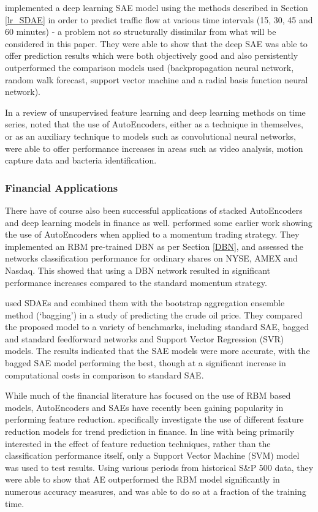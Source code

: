 \documentclass[a4paper,11pt,oneside]{article}
\theoremstyle{plain}
\theoremstyle{definition}
\begin{document}
	\citet{Lv} implemented a deep learning SAE model using the methods described in Section \ref{lr_SDAE} in order to 
	predict traffic flow at various time intervals (15, 30, 45 and 60 minutes) - a problem not so structurally dissimilar 
	from what will be considered in this paper. They were able to show that the deep SAE was able to offer prediction 
	results which were both objectively good and also persistently outperformed the comparison models used 
	(backpropagation neural network, random walk forecast, support vector machine and a radial basis function 
	neural network).
	\hfill \break 
	
	In a review of unsupervised feature learning and deep learning methods on time series, \citet{Langkvist} noted that 
	the use of AutoEncoders, either as a technique in themselves, or as an auxiliary technique to models 
	such as convolutional neural networks, were able to offer performance increases in areas such as video analysis, 
	motion capture data and bacteria identification.
	
	\subsubsection{Financial Applications}
	
	There have of course also been successful applications of stacked AutoEncoders and deep learning models in 
	finance as well. \citet{Takeuchi} performed some earlier work showing the use of AutoEncoders when applied to a 
	momentum trading strategy. They implemented an RBM pre-trained DBN as per Section \ref{DBN}, and assessed the 
	networks classification performance for ordinary shares on NYSE, AMEX and Nasdaq. This showed that using a 
	DBN network resulted in significant performance increases compared to the standard momentum strategy.
	\hfill \break 
	
	\citet{Zhao} used SDAEs and combined them with the bootstrap aggregation ensemble method (‘bagging’) in a 
	study of predicting the crude oil price. They compared the proposed model to a variety of benchmarks, including 
	standard SAE, bagged and standard feedforward networks and Support Vector Regression (SVR) models. The results indicated that the SAE models 
	were more accurate, with the bagged SAE model performing the best, though at a significant increase in 
	computational costs in comparison to standard SAE.
	\hfill \break 
	
	While much of the financial literature has focused on the use of RBM based models, AutoEncoders and SAEs have 
	recently been gaining popularity in performing feature reduction. \citet{Troiano} specifically investigate the use of 
	different feature reduction models for trend prediction in finance. In line with being primarily 
	interested in the effect of feature reduction techniques, rather than the classification performance itself, only a Support 
	Vector Machine (SVM) model was used to test results. Using various periods from historical S\&P 500 data, they were able to show 
	that AE outperformed the RBM model significantly in numerous accuracy measures, and was able to do so at a 
	fraction of the training time.
	\hfill \break 
	
\end{document}
